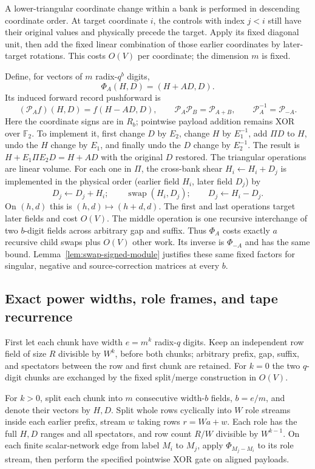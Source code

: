 A lower-triangular coordinate change within a bank is performed in
descending coordinate order.  At target coordinate $i$, the controls
with index $j<i$ still have their original values and physically precede
the target.  Apply its fixed diagonal unit, then add the fixed linear
combination of those earlier coordinates by later-target rotations.
This costs $O(V)$ per coordinate; the dimension $m$ is fixed.

Define, for vectors of $m$ radix-$q^b$ digits,
\[
 \Phi_A(H,D)=(H+AD,D).
\]
Its induced forward record pushforward is
\[
 (\mathcal P_A f)(H,D)=f(H-AD,D),\qquad
 \mathcal P_A\mathcal P_B=\mathcal P_{A+B},\qquad
 \mathcal P_A^{-1}=\mathcal P_{-A}.
\]
Here the coordinate signs are in $R_b$; pointwise payload addition
remains XOR over $\mathbb F_2$.
To implement it, first change $D$ by $E_2$, change $H$ by $E_1^{-1}$,
add $\Pi D$ to $H$, undo the $H$ change by $E_1$, and finally undo the
$D$ change by $E_2^{-1}$.  The result is
$H+E_1\Pi E_2D=H+AD$ with the original $D$ restored.  The triangular
operations are linear volume.
For each one in $\Pi$, the cross-bank shear $H_i\gets H_i+D_j$ is
implemented in the physical order (earlier field $H_i$, later field
$D_j$) by
\[
       D_j\gets D_j+H_i;\qquad
       \operatorname{swap}(H_i,D_j);\qquad
       D_j\gets H_i-D_j.
\]
On $(h,d)$ this is $(h,d)\mapsto(h+d,d)$.  The first and last
operations target later fields and cost $O(V)$.  The middle operation is
one recursive interchange of two $b$-digit fields across arbitrary gap
and suffix.  Thus $\Phi_A$ costs exactly $a$ recursive child swaps plus
$O(V)$ other work.  Its inverse is $\Phi_{-A}$ and has the same bound.
Lemma~\ref{lem:swap-signed-module} justifies these same fixed factors
for singular, negative and source-correction matrices at every $b$.

\subsection{Exact power widths, role frames, and tape recurrence}

First let each chunk have width $e=m^k$ radix-$q$ digits.  Keep an
independent row field of size $R$ divisible by $W^k$, before both chunks;
arbitrary prefix, gap, suffix, and spectators between the row and first
chunk are retained.  For $k=0$ the two $q$-digit chunks are exchanged by
the fixed split/merge construction in $O(V)$.

For $k>0$, split each chunk into $m$ consecutive width-$b$ fields,
$b=e/m$, and denote their vectors by $H,D$.  Split whole rows cyclically
into $W$ role streams inside each earlier prefix, stream $w$ taking rows
$r=Wa+w$.  Each role has the full $H,D$ ranges and all spectators, and
row count $R/W$ divisible by $W^{k-1}$.  On each finite scalar-network
edge from label $M_i$ to $M_j$, apply $\Phi_{M_j-M_i}$ to its role stream,
then perform the specified pointwise XOR gate on aligned payloads.

